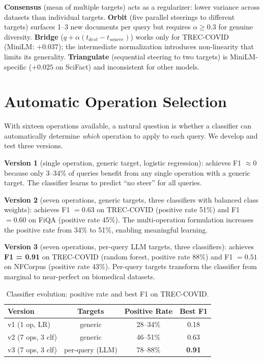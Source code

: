 \documentclass{article}
\begin{document}
\textbf{Consensus} (mean of multiple targets) acts as a regularizer: lower variance across datasets than individual targets. \textbf{Orbit} (five parallel steerings to different targets) surfaces 1--3 new documents per query but requires $\alpha \geq 0.3$ for genuine diversity. \textbf{Bridge} ($q + \alpha(t_{dest} - t_{source})$) works only for TREC-COVID (MiniLM: $+0.037$); the intermediate normalization introduces non-linearity that limits its generality. \textbf{Triangulate} (sequential steering to two targets) is MiniLM-specific ($+0.025$ on SciFact) and inconsistent for other models.

\section{Automatic Operation Selection}
\label{sec:classifier}

With sixteen operations available, a natural question is whether a classifier can automatically determine \emph{which} operation to apply to each query. We develop and test three versions.

\textbf{Version 1} (single operation, generic target, logistic regression): achieves F1 $\approx 0$ because only 3--34\% of queries benefit from any single operation with a generic target. The classifier learns to predict ``no steer'' for all queries.

\textbf{Version 2} (seven operations, generic targets, three classifiers with balanced class weights): achieves F1 $= 0.63$ on TREC-COVID (positive rate 51\%) and F1 $= 0.60$ on FiQA (positive rate 45\%). The multi-operation formulation increases the positive rate from 34\% to 51\%, enabling meaningful learning.

\textbf{Version 3} (seven operations, per-query LLM targets, three classifiers): achieves \textbf{F1 = 0.91} on TREC-COVID (random forest, positive rate 88\%) and F1 $= 0.51$ on NFCorpus (positive rate 43\%). Per-query targets transform the classifier from marginal to near-perfect on biomedical datasets.

\begin{table}[h]
\centering
\caption{Classifier evolution: positive rate and best F1 on TREC-COVID.}
\begin{tabular}{lccc}
\toprule
Version & Targets & Positive Rate & Best F1 \\
\midrule
v1 (1 op, LR) & generic & 28--34\% & 0.18 \\
v2 (7 ops, 3 clf) & generic & 46--51\% & 0.63 \\
v3 (7 ops, 3 clf) & per-query (LLM) & 78--88\% & \textbf{0.91} \\
\bottomrule
\end{tabular}
\end{table}
\end{document}
